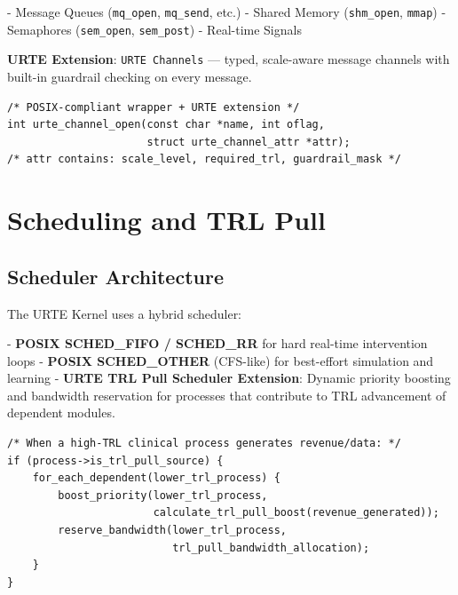 \documentclass[11pt,a4paper]{report}
\begin{document}
- Message Queues (\texttt{mq\_open}, \texttt{mq\_send}, etc.)
- Shared Memory (\texttt{shm\_open}, \texttt{mmap})
- Semaphores (\texttt{sem\_open}, \texttt{sem\_post})
- Real-time Signals

\textbf{URTE Extension}: \texttt{URTE Channels} — typed, scale-aware message channels with built-in guardrail checking on every message.

\begin{lstlisting}[style=kernelschema, caption={URTE Channel Creation (User-space API)}]
/* POSIX-compliant wrapper + URTE extension */
int urte_channel_open(const char *name, int oflag, 
                      struct urte_channel_attr *attr);
/* attr contains: scale_level, required_trl, guardrail_mask */
\end{lstlisting}

\chapter{Scheduling and TRL Pull}

\section{Scheduler Architecture}

The URTE Kernel uses a hybrid scheduler:

- \textbf{POSIX SCHED\_FIFO / SCHED\_RR} for hard real-time intervention loops
- \textbf{POSIX SCHED\_OTHER} (CFS-like) for best-effort simulation and learning
- \textbf{URTE TRL Pull Scheduler Extension}: Dynamic priority boosting and bandwidth reservation for processes that contribute to TRL advancement of dependent modules.

\begin{lstlisting}[style=kernelschema, caption={TRL Pull Scheduling Policy (Conceptual)}]
/* When a high-TRL clinical process generates revenue/data: */
if (process->is_trl_pull_source) {
    for_each_dependent(lower_trl_process) {
        boost_priority(lower_trl_process, 
                       calculate_trl_pull_boost(revenue_generated));
        reserve_bandwidth(lower_trl_process, 
                          trl_pull_bandwidth_allocation);
    }
}
\end{lstlisting}

\end{document}
